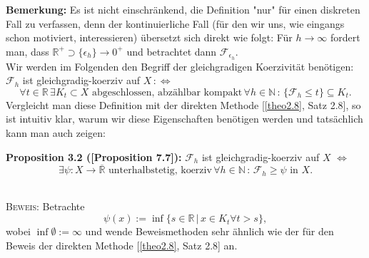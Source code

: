 \textbf{Bemerkung:} Es ist nicht einschränkend, die Definition "nur" für einen diskreten Fall zu verfassen, denn der kontinuierliche Fall (für den wir uns, wie eingangs schon motiviert, interessieren) übersetzt sich direkt wie folgt: Für \(h \to \infty\) fordert man, dass \(\mathbb{R}^+ \supset \{\epsilon_h\} \to 0^+\) und betrachtet dann \(\mathcal{F}_{{\epsilon}_h}\).\\

Wir werden im Folgenden den Begriff der gleichgradigen Koerzivität benötigen:\\
\(\mathcal{F}_h\) ist gleichgradig-koerziv auf \(X \, :\Leftrightarrow\)
\begin{equation}
    \forall t \in \mathbb{R} \, \exists K_t \subset X \text{ abgeschlossen, abzählbar kompakt} \, \forall h \in \mathbb{N} \, : \, \{\mathcal{F}_h \leq t\} \subseteq K_t.
\end{equation}
Vergleicht man diese Definition mit der direkten Methode [\ref{theo2.8}, Satz 2.8], so ist intuitiv klar, warum wir diese Eigenschaften benötigen werden und tatsächlich kann man auch zeigen:\\[0.5cm]
\colorbox{generalYellow}{\begin{minipage}{16cm}{\textcolor{black}{}{\label{prop3.2}}}
\textbf{Proposition 3.2 (\cite{MasoGamma}[Proposition 7.7]):} \(\mathcal{F}_h\) ist gleichgradig-koerziv auf \(X\) \(\Leftrightarrow\)
\begin{equation}
    \exists \psi : X \to \overline{\mathbb{R}} \text{ unterhalbstetig, koerziv} \, \forall h \in \mathbb{N} \, : \, \mathcal{F}_h \geq \psi \text{ in }X.
\end{equation}
\end{minipage}}\\

\textsc{Beweis:} Betrachte
\begin{equation}
    \psi(x) := \inf \{s \in \mathbb{R} \, | \, x \in K_t \forall t > s\},
\end{equation}
wobei \(\inf \emptyset := \infty\) und wende Beweismethoden sehr ähnlich wie der für den Beweis der direkten Methode [\ref{theo2.8}, Satz 2.8] an. \QEDB

